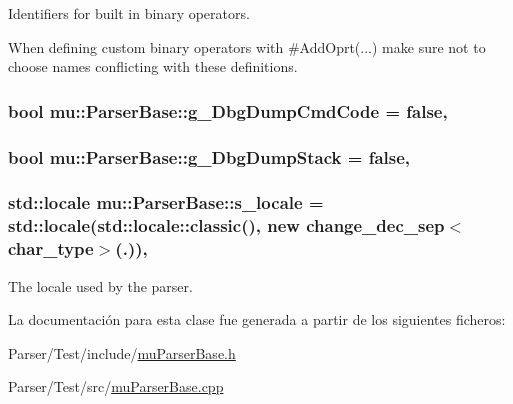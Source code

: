 Identifiers for built in binary operators. 

When defining custom binary operators with \#\+Add\+Oprt(...) make sure not to choose names conflicting with these definitions. 
\subsubsection[{\texorpdfstring{g\+\_\+\+Dbg\+Dump\+Cmd\+Code}{g_DbgDumpCmdCode}}]{\setlength{\rightskip}{0pt plus 5cm}bool mu\+::\+Parser\+Base\+::g\+\_\+\+Dbg\+Dump\+Cmd\+Code = false\hspace{0.3cm}{\ttfamily [static]}, {\ttfamily [protected]}}\hypertarget{classmu_1_1_parser_base_abe673a44e0ea620656422657cb3f6518}{}\label{classmu_1_1_parser_base_abe673a44e0ea620656422657cb3f6518}
\subsubsection[{\texorpdfstring{g\+\_\+\+Dbg\+Dump\+Stack}{g_DbgDumpStack}}]{\setlength{\rightskip}{0pt plus 5cm}bool mu\+::\+Parser\+Base\+::g\+\_\+\+Dbg\+Dump\+Stack = false\hspace{0.3cm}{\ttfamily [static]}, {\ttfamily [protected]}}\hypertarget{classmu_1_1_parser_base_a35349445f839ab8bc2cfb54488c45267}{}\label{classmu_1_1_parser_base_a35349445f839ab8bc2cfb54488c45267}
\subsubsection[{\texorpdfstring{s\+\_\+locale}{s_locale}}]{\setlength{\rightskip}{0pt plus 5cm}std\+::locale mu\+::\+Parser\+Base\+::s\+\_\+locale = std\+::locale(std\+::locale\+::classic(), new {\bf change\+\_\+dec\+\_\+sep}$<${\bf char\+\_\+type}$>$(\textquotesingle{}.\textquotesingle{}))\hspace{0.3cm}{\ttfamily [static]}, {\ttfamily [protected]}}\hypertarget{classmu_1_1_parser_base_ad594b199c33edf6962ba0e21010bc86e}{}\label{classmu_1_1_parser_base_ad594b199c33edf6962ba0e21010bc86e}


The locale used by the parser. 



La documentación para esta clase fue generada a partir de los siguientes ficheros\+:\begin{DoxyCompactItemize}
\item 
Parser/\+Test/include/\hyperlink{mu_parser_base_8h}{mu\+Parser\+Base.\+h}\item 
Parser/\+Test/src/\hyperlink{mu_parser_base_8cpp}{mu\+Parser\+Base.\+cpp}\end{DoxyCompactItemize}
